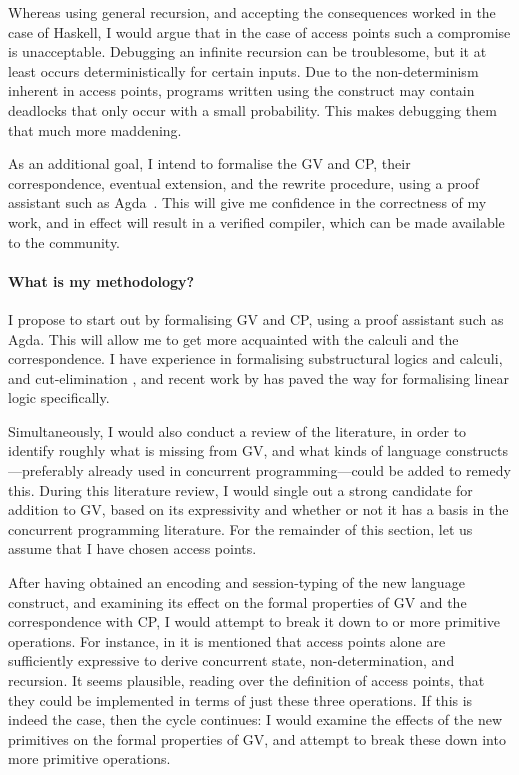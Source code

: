 \documentclass{scrartcl}
\begin{document}
Whereas using general recursion, and accepting the consequences worked
in the case of Haskell, I would argue that in the case of access points
such a compromise is unacceptable.
Debugging an infinite recursion can be troublesome, but it at least
occurs deterministically for certain inputs.
Due to the non-determinism inherent in access points, programs written
using the construct may contain deadlocks that only occur with a small
probability. This makes debugging them that much more maddening.

As an additional goal, I intend to formalise the GV and CP, their
correspondence, eventual extension, and the rewrite procedure, using a
proof assistant such as Agda~\citep{norell2009}.
This will give me confidence in the correctness of my work, and in
effect will result in a verified compiler, which can be made available
to the community.

\paragraph{What is my methodology?}
I propose to start out by formalising GV and CP, using a proof
assistant such as Agda. This will allow me to get more acquainted with
the calculi and the correspondence.
I have experience in formalising substructural logics and calculi, and
cut-elimination \citep{kokke2015}, and recent work by \citet{allais2015}
has paved the way for formalising linear logic specifically.

Simultaneously, I would also conduct a review of the literature, in
order to identify roughly what is missing from GV, and what kinds of
language constructs---preferably already  used in concurrent
programming---could be added to remedy this.
During this literature review, I would single out a strong candidate
for addition to GV, based on its expressivity and whether or not
it has a basis in the concurrent programming literature.
For the remainder of this section, let us assume that I have chosen
access points.

After having obtained an encoding and session-typing of the new
language construct, and examining its effect on the formal properties
of GV and the correspondence with CP, I would attempt to break it down
to or more primitive operations.
For instance, in \citet{lindley2015lightweight} it is mentioned that access
points alone are sufficiently expressive to derive concurrent state,
non-determination, and recursion. It seems plausible, reading over the
definition of access points, that they could be implemented in terms
of just these three operations.
If this is indeed the case, then the cycle continues: I would examine
the effects of the new primitives on the formal properties of GV, and
attempt to break these down into more primitive operations.
\end{document}
